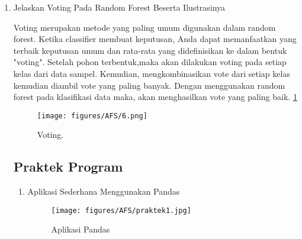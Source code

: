 \begin{enumerate}
 b= 1

 c= 1

 d= 3

Kemudian kita dapat mencari nilai Recall, Precision, accuracy dan Error Rate

 Recall =3/(1+3) = 0,75

 Precision = 3/(1+3) = 0,75

 Accuracy =(5+3)/(5+1+1+3) = 0,8

 Error Rate =(1+1)/(5+1+1+3) = 0,2

\item Jelaskan Voting Pada Random Forest Beserta Ilustrasinya 
\par Voting merupakan metode yang paling umum digunakan dalam random forest. Ketika classifier membuat keputusan, Anda dapat memanfaatkan yang terbaik keputusan umum dan rata-rata yang didefinisikan ke dalam bentuk "voting". Setelah pohon terbentuk,maka akan dilakukan voting pada setiap kelas dari data sampel. Kemudian, mengkombinasikan vote dari setiap kelas kemudian diambil vote yang paling banyak. Dengan menggunakan random forest pada klasifikasi data maka, akan menghasilkan vote yang paling baik. \ref{AFS6}
		\begin{figure}[ht]
		\centerline{\texttt{[image: figures/AFS/6.png]}}
		\caption{Voting.}
		\label{AFS6}
		\end{figure}



\subsection{Praktek Program}
\begin{enumerate}
\item Aplikasi Sederhana Menggunakan Pandas
	\begin{figure}[ht]
	\centering
	\texttt{[image: figures/AFS/praktek1.jpg]}
	\caption{Aplikasi Pandas}
	\label{contoh}
	\end{figure}


\end{enumerate}
\end{enumerate}
